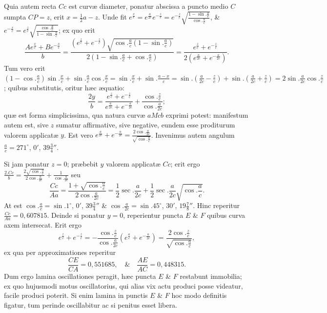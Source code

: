 Quia autem recta $Cc$ est curvæ diameter, ponatur abscissa a puncto medio $C$ sumpta $CP=z$, erit $x=\frac12a-z$.
Unde fit $e^{\frac xc}=e^{\frac a{2c}}e^{-\frac zc}=e^{-\frac zc}\sqrt{\frac{1-\sin.\frac ac}{\cos.\frac ac}}$, \& $e^{-\frac xc}=e^{\frac zc}\sqrt{\frac{\cos.\frac ac}{1-\sin.\frac ac}}$; ex quo erit
\[\frac{Ae^{\frac xc}+Be^{-\frac xc}}b=\frac{(e^{\frac zc}+e^{-\frac zc})\sqrt{\cos.\frac ac(1-\sin.\frac ac)}}{2(1-\sin.\frac ac+\cos.\frac ac)}=\frac{e^{\frac zc}+e^{-\frac zc}}{2(e^{\frac a{2c}}+e^{-\frac a{2c}})}.\]
Tum vero erit $(1-\cos.\frac ac)\sin.\frac xc+\sin.\frac ac\cos.\frac xc=\sin.\frac xc+\sin.\frac{a-x}c=\sin.(\frac a{2c}-\frac zc)+\sin.(\frac a{2c}+\frac zc)=2\sin.\frac a{2c}\cos.\frac zc$; quibus substitutis, oritur hæc æquatio:
\[\frac{2y}b=\frac{e^{\frac zc}+e^{-\frac zc}}{e^{\frac a{2c}}+e^{-\frac a{2c}}}+\frac{\cos.\frac zc}{\cos.\frac a{2c}};\]
quæ est forma simplicissima, qua natura curvæ $aMcb$ exprimi potest: manifestum autem est, sive $z$ sumatur affirmative, sive negative, eundem esse proditurum valorem applicatæ $y$. Est vero $e^{\frac a{2c}}+e^{-\frac a{2c}}=\frac{2\cos.\frac a{2c}}{\sqrt{\cos.\frac ac}}$. Invenimus autem angulum $\frac ac=271^\circ$, $0'$, $39\frac34''$.

Si jam ponatur $z=0$; præbebit $y$ valorem applicatæ $Cc$; erit ergo $\frac{2.Cc}b=\frac{2\sqrt{\cos.\frac ac}}{2\cos.\frac a{2c}}+\frac1{\cos.\frac a{2c}}$ seu
\[\frac{Cc}{Aa}=\frac{1+\sqrt{\cos.\frac ac}}{2\cos.\frac a{2c}}=\frac12\sec.\frac a{2c}+\frac12\sec.\frac a{2c}\sqrt{\cos.\frac ac}.\]
At est $\cos.\frac ac=\sin.1^\circ$, $0'$, $39\frac34''$ \& $\cos.\frac a{2c}=\sin.45^\circ$, $30'$, $19\frac78''$. Hinc reperitur $\frac{Cc}{Aa}=0{,}607815$. Deinde si ponatur $y=0$, reperientur puncta $E$ \& $F$ quibus curva axem intersecat. Erit ergo
\[e^{\frac zc}+e^{-\frac zc}=-\frac{\cos.\frac zc}{\cos.\frac a{2c}}(e^{\frac ac}+e^{-\frac a{2c}})=\frac{2\cos.\frac zc}{\sqrt{\cos.\frac ac}},\]
ex qua per approximationes reperitur
\[\frac{CE}{CA}=0{,}551685,\quad\&\quad\frac{AE}{AC}=0{,}448315.\]
Dum ergo lamina oscillationes peragit, hæc puncta $E$ \& $F$ restabunt immobilia; ex quo hujusmodi motus oscillatorius, qui alias vix actu produci posse videatur, facile produci poterit. Si enim lamina in punctis $E$ \& $F$ hoc modo definitis figatur, tum perinde oscillabitur ac si penitus esset libera.

